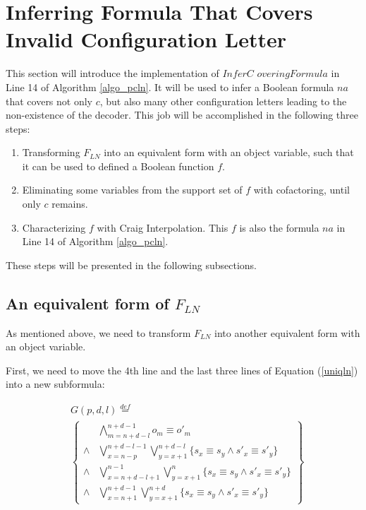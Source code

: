 \documentclass{acm_proc_article-sp}
\begin{document}
\section{Inferring Formula That Covers Invalid Configuration Letter}\label{sec_infer}
This section will introduce the implementation of $InferC$ $overingFormula$ in Line 14 of Algorithm \ref{algo_pcln}.
It will be used to infer a Boolean formula $na$
that covers not only $c$,
but also many other configuration letters leading to the non-existence of the decoder.
This job will be accomplished in the following three steps:
\begin{enumerate}
 \item Transforming $F_{LN}$ into an equivalent form with an object variable,
       such that it can be used to defined a Boolean function $f$.
 \item Eliminating some variables from the support set of $f$ with cofactoring\cite{Cofact},
       until only $c$ remains.
 \item Characterizing $f$ with Craig Interpolation.
       This $f$ is also the formula $na$ in Line 14 of Algorithm \ref{algo_pcln}.
\end{enumerate}

These steps will be presented in the following subsections.

\subsection{An equivalent form of $F_{LN}$}

As mentioned above,
we need to transform $F_{LN}$ into another equivalent form with an object variable.

First,
we need to move the 4th line and the last three lines of Equation (\ref{uniqln}) into a new subformula:

\begin{equation}\label{uniqln_subg}
\begin{split}
&G(p,d,l)\stackrel{def}{=}\\
&\left\{
\begin{array}{cc}
&\bigwedge_{m=n+d-l}^{n+d-1}o_m\equiv o'_m \\
\wedge& \bigvee_{x=n-p}^{n+d-l-1}\bigvee_{y=x+1}^{n+d-l} \{s_x\equiv s_y\wedge s'_x\equiv s'_y\} \\
\wedge& \bigvee_{x=n+d-l+1}^{n-1}\bigvee_{y=x+1}^{n} \{s_x\equiv s_y\wedge s'_x\equiv s'_y\} \\
\wedge& \bigvee_{x=n+1}^{n+d-1}\bigvee_{y=x+1}^{n+d} \{s_x\equiv s_y\wedge s'_x\equiv s'_y\}
\end{array}
\right\}
\end{split}
\end{equation}
\end{document}
